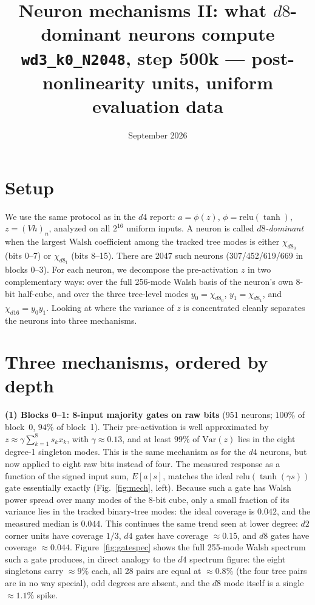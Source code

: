\documentclass[10pt]{article}
\title{\vspace{-1.2cm}Neuron mechanisms II: what $d8$-dominant neurons compute\\
\large \texttt{wd3\_k0\_N2048}, step 500k --- post-nonlinearity units, uniform evaluation data}
\author{}\date{September 2026}
\begin{document}
\maketitle\vspace{-1.4cm}

\section*{Setup}
We use the same protocol as in the $d4$ report: $a=\phi(z)$, $\phi=\mathrm{relu}(\tanh)$, $z=(Vh)_n$,
analyzed on all $2^{16}$ uniform inputs. A neuron is called \emph{$d8$-dominant} when the largest
Walsh coefficient among the tracked tree modes is either $\chi_{d8_0}$ (bits 0--7) or
$\chi_{d8_1}$ (bits 8--15). There are 2047 such neurons (307/452/619/669 in blocks 0--3).
For each neuron, we decompose the pre-activation $z$ in two complementary ways: over the full
256-mode Walsh basis of the neuron's own 8-bit half-cube, and over the three tree-level modes
$y_0=\chi_{d8_0}$, $y_1=\chi_{d8_1}$, and $\chi_{d16}=y_0y_1$. Looking at where the variance
of $z$ is concentrated cleanly separates the neurons into three mechanisms.

\section*{Three mechanisms, ordered by depth}
\textbf{(1) Blocks 0--1: 8-input majority gates on raw bits} (951 neurons; $100\%$ of
block~0, $94\%$ of block~1). Their pre-activation is well approximated by
$z\approx\gamma\sum_{k=1}^{8}s_kx_k$, with $\gamma\approx0.13$, and at least $99\%$ of
$\mathrm{Var}(z)$ lies in the eight degree-1 singleton modes. This is the same mechanism as
for the $d4$ neurons, but now applied to eight raw bits instead of four. The measured response
as a function of the signed input sum, $E[a\,|\,s]$, matches the ideal
$\mathrm{relu}(\tanh(\gamma s))$ gate essentially exactly (Fig.~\ref{fig:mech}, left).
Because such a gate has Walsh power spread over many modes of the 8-bit cube, only a small
fraction of its variance lies in the tracked binary-tree modes: the ideal coverage is $0.042$,
and the measured median is $0.044$. This continues the same trend seen at lower degree:
$d2$ corner units have coverage $1/3$, $d4$ gates have coverage $\approx0.15$, and $d8$ gates
have coverage $\approx0.044$. Figure~\ref{fig:gatespec} shows the full 255-mode Walsh
spectrum such a gate produces, in direct analogy to the $d4$ spectrum figure: the eight
singletons carry $\approx9\%$ each, all 28 pairs are equal at $\approx0.8\%$ (the four tree
pairs are in no way special), odd degrees are absent, and the $d8$ mode itself is a single
$\approx1.1\%$ spike.
\end{document}
